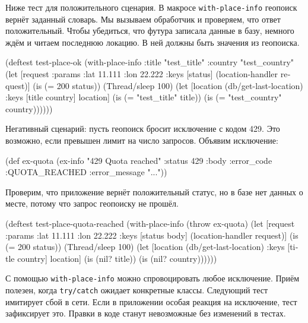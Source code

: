 Ниже тест для положительного сценария. В макросе \verb|with-place-info|
геопоиск вернёт заданный словарь. Мы вызываем обработчик и проверяем, что ответ
положительный. Чтобы убедиться, что футура записала данные в базу, немного ждём
и читаем последнюю локацию. В ней должны быть значения из геопоиска.

\begin{english}
  \begin{clojure}
(deftest test-place-ok
  (with-place-info
    {:title "test_title"
     :country "test_country"}
    (let [request {:params {:lat 11.111 :lon 22.222}}
          {:keys [status]} (location-handler request)]
      (is (= 200 status))
      (Thread/sleep 100)
      (let [location (db/get-last-location)
            {:keys [title country]} location]
        (is (= "test_title" title))
        (is (= "test_country" country))))))
  \end{clojure}
\end{english}


Негативный сценарий: пусть геопоиск бросит исключение с кодом 429. Это
возможно, если превышен лимит на число запросов. Объявим исключение:

\begin{english}
  \begin{clojure}
(def ex-quota
  (ex-info "429 Quota reached"
           {:status 429
            :body {:error_code :QUOTA_REACHED
                   :error_message "..."}}))
  \end{clojure}
\end{english}

\noindent
Проверим, что приложение вернёт положительный статус, но в базе нет данных о
месте, потому что запрос геопоиску не прошёл.

\begin{english}
  \begin{clojure}
(deftest test-place-quota-reached
  (with-place-info (throw ex-quota)
    (let [request {:params {:lat 11.111 :lon 22.222}}
          {:keys [status body]} (location-handler request)]
      (is (= 200 status))
      (Thread/sleep 100)
      (let [location (db/get-last-location)
            {:keys [title country]} location]
        (is (nil? title))
        (is (nil? country))))))
  \end{clojure}
\end{english}

С помощью \verb|with-place-info| можно спровоцировать любое исключение. Приём
полезен, когда \verb|try/catch| ожидает конкретные классы. Следующий тест
имитирует сбой в сети. Если в приложении особая реакция на исключение, тест
зафиксирует это. Правки в коде станут невозможные без изменений в тестах.

